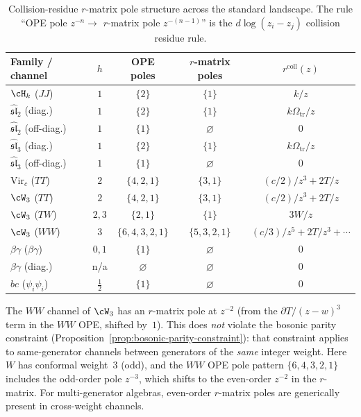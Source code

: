 \begin{table}[ht]
\centering
\renewcommand{\arraystretch}{1.15}
\caption{Collision-residue $r$-matrix pole structure across the
standard landscape. The rule ``OPE pole $z^{-n} \to$
$r$-matrix pole $z^{-(n-1)}$'' is the $d\log(z_i-z_j)$ collision
residue rule.}
\label{tab:rmatrix-pole-landscape}
\begin{tabular}{lcccc}
\toprule
\textbf{Family / channel}
& \textbf{$h$}
& \textbf{OPE poles}
& \textbf{$r$-matrix poles}
& \textbf{$r^{\mathrm{coll}}(z)$} \\
\midrule
$\cH_k$ ($JJ$)
 & $1$ & $\{2\}$ & $\{1\}$ & $k/z$ \\
$\hat{\mathfrak{sl}}_2$ (diag.)
 & $1$ & $\{2\}$ & $\{1\}$ & $k\Omega_{\mathrm{tr}}/z$ \\
$\hat{\mathfrak{sl}}_2$ (off-diag.)
 & $1$ & $\{1\}$ & $\varnothing$ & $0$ \\
$\hat{\mathfrak{sl}}_3$ (diag.)
 & $1$ & $\{2\}$ & $\{1\}$ & $k\Omega_{\mathrm{tr}}/z$ \\
$\hat{\mathfrak{sl}}_3$ (off-diag.)
 & $1$ & $\{1\}$ & $\varnothing$ & $0$ \\
$\mathrm{Vir}_c$ ($TT$)
 & $2$ & $\{4,2,1\}$ & $\{3,1\}$ & $(c/2)/z^3 + 2T/z$ \\
$\cW_3$ ($TT$)
 & $2$ & $\{4,2,1\}$ & $\{3,1\}$ & $(c/2)/z^3 + 2T/z$ \\
$\cW_3$ ($TW$)
 & $2,3$ & $\{2,1\}$ & $\{1\}$ & $3W/z$ \\
$\cW_3$ ($WW$)
 & $3$ & $\{6,4,3,2,1\}$ & $\{5,3,2,1\}$
 & $(c/3)/z^5 + 2T/z^3 + \cdots$ \\
$\beta\gamma$ ($\beta\gamma$)
 & $0,1$ & $\{1\}$ & $\varnothing$ & $0$ \\
$\beta\gamma$ (diag.)
 & n/a & $\varnothing$ & $\varnothing$ & $0$ \\
$bc$ ($\psi_i\psi_i$)
 & $\tfrac{1}{2}$ & $\{1\}$ & $\varnothing$ & $0$ \\
\bottomrule
\end{tabular}
\end{table}

\begin{remark}
\label{rem:w3-ww-even-poles}
The $WW$ channel of $\cW_3$ has an $r$-matrix pole at $z^{-2}$
(from the $\partial T/(z{-}w)^3$ term in the $WW$ OPE, shifted by~$1$).
This does \emph{not} violate the bosonic parity constraint
(Proposition~\ref{prop:bosonic-parity-constraint}): that constraint
applies to same-generator channels between generators of the
\emph{same} integer weight.
Here $W$ has conformal weight~$3$ (odd), and the $WW$ OPE pole
pattern $\{6, 4, 3, 2, 1\}$ includes the odd-order pole $z^{-3}$,
which shifts to the even-order $z^{-2}$ in the $r$-matrix.
For multi-generator algebras, even-order $r$-matrix poles are
generically present in cross-weight channels.
\end{remark}

